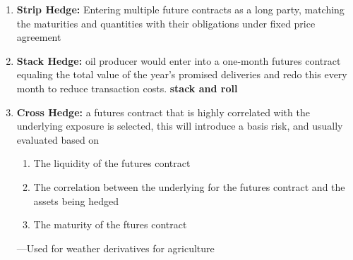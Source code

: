 \documentclass[11pt,fleqn]{book} %
\numberwithin{equation}{section} %
\numberwithin{figure}{section} %
\numberwithin{table}{section} %
\begin{document}
\begin{definition}
\begin{enumerate}
    \item \textbf{Strip Hedge:} Entering multiple future contracts as a long party, matching the maturities and quantities with their obligations under fixed price agreement
    \item \textbf{Stack Hedge:} oil producer would enter into a one-month futures contract equaling the total value of the year's promised deliveries and redo this every month to reduce transaction costs. \textbf{stack and roll}
    \item \textbf{Cross Hedge:} a futures contract that is highly correlated with the underlying exposure is selected, this will introduce a basis risk, and usually evaluated based on
    \begin{enumerate}
        \item The liquidity of the futures contract
        \item The correlation between the underlying for the futures contract and the assets being hedged
        \item The maturity of the ftures contract
    \end{enumerate}
    ---Used for weather derivatives for agriculture
\end{enumerate}
\end{definition}
\end{document}
